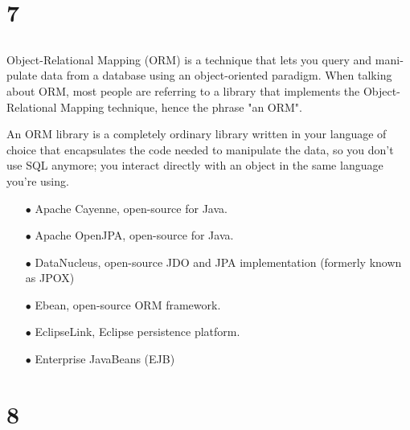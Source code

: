 \documentclass{article}
\begin{document}
\section{7}
\subsection{}
\subsection{}
\subsection{}
\begin{latin}
Object-Relational Mapping (ORM) is a technique that lets you query and manipulate data from a database using an object-oriented paradigm. When talking about ORM, most people are referring to a library that implements the Object-Relational Mapping technique, hence the phrase "an ORM".

An ORM library is a completely ordinary library written in your language of choice that encapsulates the code needed to manipulate the data, so you don't use SQL anymore; you interact directly with an object in the same language you're using.

\begin{itemize}
    \item [$\bullet$] Apache Cayenne, open-source for Java.
    \item [$\bullet$] Apache OpenJPA, open-source for Java.
	\item [$\bullet$] DataNucleus, open-source JDO and JPA implementation (formerly known as JPOX)
	\item [$\bullet$] Ebean, open-source ORM framework.
	\item [$\bullet$] EclipseLink, Eclipse persistence platform.
	\item [$\bullet$] Enterprise JavaBeans (EJB)
\end{itemize}
\end{latin}

\section{8}


\end{document}
